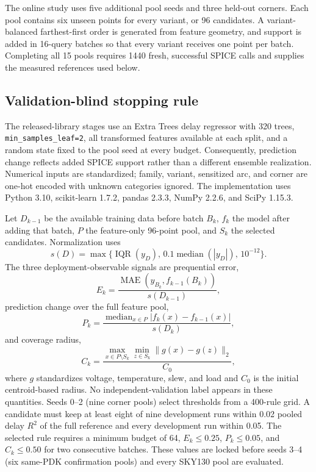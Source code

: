 \documentclass[preprint,12pt]{elsarticle}
\begin{document}
The online study uses five additional pool seeds and three held-out corners. Each pool contains six unseen points for every variant, or 96 candidates. A variant-balanced farthest-first order is generated from feature geometry, and support is added in 16-query batches so that every variant receives one point per batch. Completing all 15 pools requires 1440 fresh, successful SPICE calls and supplies the measured references used below.

\subsection{Validation-blind stopping rule}

The released-library stages use an Extra Trees delay regressor with 320 trees, \texttt{min\_samples\_leaf=2}, all transformed features available at each split, and a random state fixed to the pool seed at every budget. Consequently, prediction change reflects added SPICE support rather than a different ensemble realization. Numerical inputs are standardized; family, variant, sensitized arc, and corner are one-hot encoded with unknown categories ignored. The implementation uses Python 3.10, scikit-learn 1.7.2, pandas 2.3.3, NumPy 2.2.6, and SciPy 1.15.3.

Let $D_{k-1}$ be the available training data before batch $B_k$, $f_k$ the model after adding that batch, $P$ the feature-only 96-point pool, and $S_k$ the selected candidates. Normalization uses
\begin{equation}
s(D)=\max\{\operatorname{IQR}(y_D),\,0.1\operatorname{median}(|y_D|),\,10^{-12}\}.
\end{equation}
The three deployment-observable signals are prequential error,
\begin{equation}
E_k=\frac{\operatorname{MAE}(y_{B_k},f_{k-1}(B_k))}{s(D_{k-1})},
\end{equation}
prediction change over the full feature pool,
\begin{equation}
P_k=\frac{\operatorname{median}_{x\in P}|f_k(x)-f_{k-1}(x)|}{s(D_k)},
\end{equation}
and coverage radius,
\begin{equation}
C_k=\frac{\max_{x\in P\setminus S_k}\min_{z\in S_k}\lVert g(x)-g(z)\rVert_2}{C_0},
\end{equation}
where $g$ standardizes voltage, temperature, slew, and load and $C_0$ is the initial centroid-based radius. No independent-validation label appears in these quantities. Seeds 0--2 (nine corner pools) select thresholds from a 400-rule grid. A candidate must keep at least eight of nine development runs within 0.02 pooled delay $R^2$ of the full reference and every development run within 0.05. The selected rule requires a minimum budget of 64, $E_k\leq0.25$, $P_k\leq0.05$, and $C_k\leq0.50$ for two consecutive batches. These values are locked before seeds 3--4 (six same-PDK confirmation pools) and every SKY130 pool are evaluated.
\end{document}
